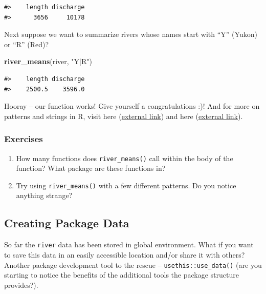 \documentclass[
]{book}
\newenvironment{Shaded}{\begin{snugshade}}{\end{snugshade}}
\newcommand{\KeywordTok}[1]{\textcolor[rgb]{0.13,0.29,0.53}{\textbf{#1}}}
\newcommand{\NormalTok}[1]{#1}
\newcommand{\StringTok}[1]{\textcolor[rgb]{0.31,0.60,0.02}{#1}}
\begin{document}
\begin{verbatim}
#>    length discharge 
#>      3656     10178
\end{verbatim}

Next suppose we want to summarize rivers whose names start with ``Y'' (Yukon) or ``R'' (Red)?

\begin{Shaded}
\begin{Highlighting}[]
\KeywordTok{river_means}\NormalTok{(river, }\StringTok{"Y|R"}\NormalTok{)}
\end{Highlighting}
\end{Shaded}

\begin{verbatim}
#>    length discharge 
#>    2500.5    3596.0
\end{verbatim}

Hooray -- our function works! Give yourself a congratulations :)! And for more on patterns and strings in R, visit here (\href{https://r4ds.had.co.nz/strings.html}{external link}) and here (\href{https://bookdown.org/rdpeng/rprogdatascience/regular-expressions.html\#sub-and-gsub}{external link}).

\hypertarget{ex-set2}{%
\subsubsection{Exercises}\label{ex-set2}}

\begin{enumerate}
\def\labelenumi{\arabic{enumi}.}
\item
  How many functions does \texttt{river\_means()} call within the body of the function? What package are these functions in?
\item
  Try using \texttt{river\_means()} with a few different patterns. Do you notice anything strange?
\end{enumerate}

\hypertarget{creating-data}{%
\subsection{Creating Package Data}\label{creating-data}}

So far the \texttt{river} data has been stored in global environment. What if you want to save this data in an easily accessible location and/or share it with others? Another package development tool to the rescue -- \texttt{usethis::use\_data()} (are you starting to notice the benefits of the additional tools the package structure provides?).
\end{document}
